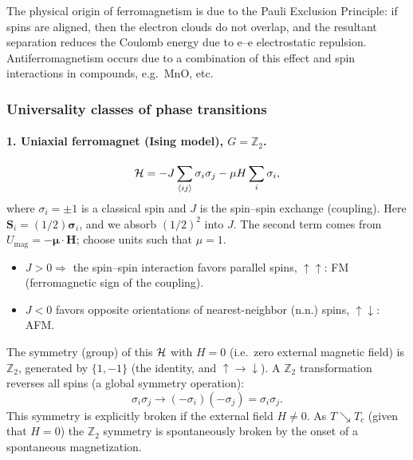 The physical origin of ferromagnetism is due to the Pauli Exclusion Principle: if spins
are aligned, then the electron clouds do not overlap, and the resultant separation
reduces the Coulomb energy due to e--e electrostatic repulsion. Antiferromagnetism occurs
due to a combination of this effect and spin interactions in compounds, e.g.\ MnO, etc.

\subsubsection*{Universality classes of phase transitions}

\paragraph{1. Uniaxial ferromagnet (Ising model), \texorpdfstring{$G = \mathbb{Z}_2$}{G = Z2}.}

\begin{equation}
  \mathcal{H} = -J\sum_{\langle ij\rangle}\sigma_i\sigma_j - \mu H\sum_i\sigma_i ,
\end{equation}
where $\sigma_i = \pm 1$ is a classical spin and $J$ is the spin--spin exchange
(coupling). Here $\mathbf{S}_i = (1/2)\boldsymbol{\sigma}_i$, and we absorb
$(1/2)^2$ into $J$. The second term comes from
$U_{\text{mag}} = -\boldsymbol{\mu}\cdot\mathbf{H}$; choose units such that $\mu = 1$.
\begin{itemize}
  \item $J>0\Rightarrow$ the spin--spin interaction favors parallel spins,
    $\uparrow\uparrow$: FM (ferromagnetic sign of the coupling).
  \item $J<0$ favors opposite orientations of nearest-neighbor (n.n.) spins,
    $\uparrow\downarrow$: AFM.
\end{itemize}
The symmetry (group) of this $\mathcal{H}$ with $H = 0$ (i.e.\ zero external magnetic field) is
$\mathbb{Z}_2$, generated by $\{1,-1\}$ (the identity, and $\uparrow\to\downarrow$). A
$\mathbb{Z}_2$ transformation reverses all spins (a global symmetry operation):
\begin{equation}
  \sigma_i\sigma_j\to(-\sigma_i)(-\sigma_j) = \sigma_i\sigma_j .
\end{equation}
This symmetry is explicitly broken if the external field $H\ne 0$. As $T\searrow T_c$
(given that $H = 0$) the $\mathbb{Z}_2$ symmetry is spontaneously broken by the onset of
a spontaneous magnetization.

\begin{diagram}
\end{diagram}

